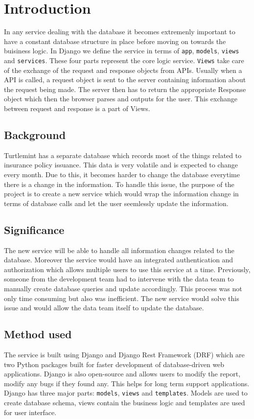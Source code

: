 \chapter{Introduction}

In any service dealing with the database it becomes extremenly important to
have a constant database structure in place before moving on towards the
buisiness logic. In Django we define the service in terms of \texttt{app},
\texttt{models}, \texttt{views} and \texttt{services}. These four parts
represent the core logic service.
\texttt{Views} take care of the exchange of the request and response objects from APIs.
Usually when a API is called, a request object is sent to the server containing
information about the request being made. The server then has to return the
appropriate Response object which then the browser parses and outputs for the
user. This exchange between request and response is a part of Views.

\section{\textbf{Background}}
Turtlemint has a separate database which records most of the things related to
insurance policy issuance. This data is very volatile and is expected to change
every month. Due to this, it becomes harder to change the database everytime
there is a change in the information. To handle this issue, the purpose of the
project is to create a new service which would wrap the information change in
terms of database calls and let the user seemlessly update the information.

\section{\textbf{Significance}}
The new service will be able to handle all information changes related to the
database. Moreover the service would have an integrated authentication and
authorization which allows multiple users to use this service at a time.
Previously, someone from the development team had to intervene with the data
team to manually create database queries and update accordingly. This process
was not only time consuming but also was inefficient. The new service would
solve this issue and would allow the data team itself to update the database.

\section{\textbf{Method used}}
The service is built using Django and Django Rest Framework (DRF) which are
two Python packages built for faster development of database-driven web
applications. Django is also open-source and allows users to modify the
report, modify any bugs if they found any. This helps for long term
support applications. Django has three major parts: \texttt{models},
\texttt{views} and \texttt{templates}. Models are used to create database
schema, views contain the business logic and templates are used for user
interface.

